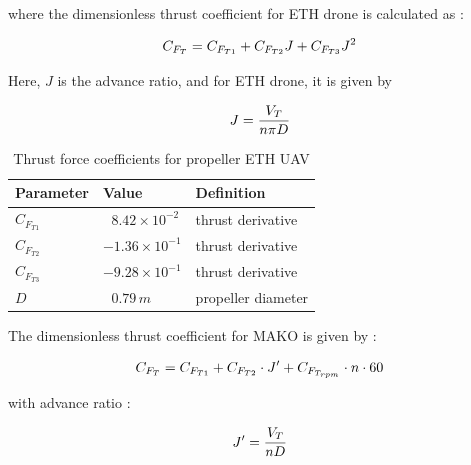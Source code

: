 where the dimensionless thrust coefficient for ETH drone is calculated as :

\begin{equation}{\label{eqn:thrustETHcraft}}
C_{F_T} = C_{F_{T1}} + C_{F_{T2}} J + C_{F_{T3}} J^2 
\end{equation}

Here, $J$ is the advance ratio, and for ETH drone, it is given by

\begin{equation}{\label{eqn:advRatETHcraft}}
J = \frac{V_T}{n \pi D}
\end{equation}

\begin{table}
\label{arm:ETHcraft}
\caption{Thrust force coefficients for propeller ETH UAV \cite{ducard2009fault}}
\label{arm:thrustForce}
\begin{center}
\begin{tabular}{ ||p{3cm}|p{3cm}|p{4cm}||}\hline
\textbf{Parameter} & \textbf{Value} & \textbf{Definition} \\\hline
$C_{F_{T1}} $                 & $\ \ \, 8.42 \times 10^{-2}$	   & thrust derivative \\\hline
$C_{F_{T2}} $                 & $-1.36 \times 10^{-1}$	           & thrust derivative \\\hline
$C_{F_{T3}} $                 & $-9.28 \times 10^{-1}$                 & thrust derivative \\\hline
$D$                                 & $\ \ \, 0.79 \, m$                           & propeller diameter \\\hline
\end{tabular}
\end{center}
\end{table}

The dimensionless thrust coefficient for MAKO is given by \cite{bronz2017flight} :

\begin{equation}{\label{eqn:thrustCoefMAKO}}
C_{F_T} = C_{F_{T1}} + C_{F_{T2}} \cdot J^\prime + C_{F_{T_{rpm}}} \cdot n \cdot 60 
\end{equation}

with advance ratio :

\begin{equation}{\label{eqn:advRatMAKO}}
J^\prime = \frac{V_T}{n D}
\end{equation}

